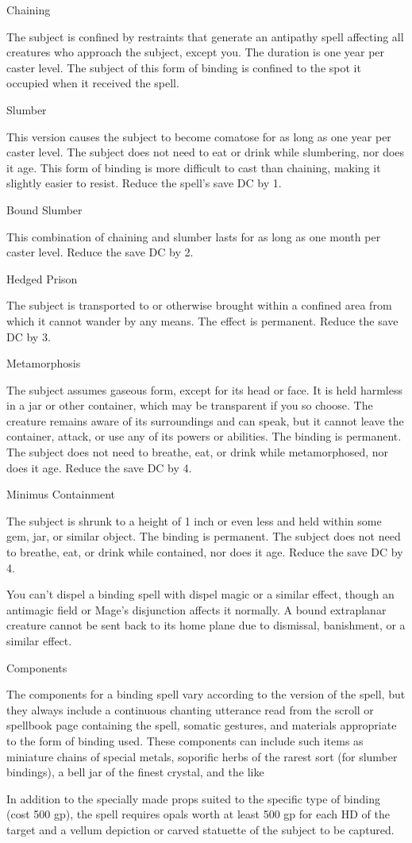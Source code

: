 {Chaining

	The subject is confined by restraints that generate an antipathy spell affecting all creatures who approach the subject, except you. The duration is one year per caster level. The subject of this form of binding is confined to the spot it occupied when it received the spell.

Slumber

	This version causes the subject to become comatose for as long as one year per caster level. The subject does not need to eat or drink while slumbering, nor does it age. This form of binding is more difficult to cast than chaining, making it slightly easier to resist. Reduce the spell's save DC by 1.

Bound Slumber

	This combination of chaining and slumber lasts for as long as one month per caster level. Reduce the save DC by 2.

Hedged Prison

	The subject is transported to or otherwise brought within a confined area from which it cannot wander by any means. The effect is permanent. Reduce the save DC by 3.

Metamorphosis

	The subject assumes gaseous form, except for its head or face. It is held harmless in a jar or other container, which may be transparent if you so choose. The creature remains aware of its surroundings and can speak, but it cannot leave the container, attack, or use any of its powers or abilities. The binding is permanent. The subject does not need to breathe, eat, or drink while metamorphosed, nor does it age. Reduce the save DC by 4.

Minimus Containment

	The subject is shrunk to a height of 1 inch or even less and held within some gem, jar, or similar object. The binding is permanent. The subject does not need to breathe, eat, or drink while contained, nor does it age. Reduce the save DC by 4.


	You can't dispel a binding spell with dispel magic or a similar effect, though an antimagic field or Mage's disjunction affects it normally. A bound extraplanar creature cannot be sent back to its home plane due to dismissal, banishment, or a similar effect.

Components

	The components for a binding spell vary according to the version of the spell, but they always include a continuous chanting utterance read from the scroll or spellbook page containing the spell, somatic gestures, and materials appropriate to the form of binding used. These components can include such items as miniature chains of special metals, soporific herbs of the rarest sort (for slumber bindings), a bell jar of the finest crystal, and the like


	In addition to the specially made props suited to the specific type of binding (cost 500 gp), the spell requires opals worth at least 500 gp for each HD of the target and a vellum depiction or carved statuette of the subject to be captured.
}
        
